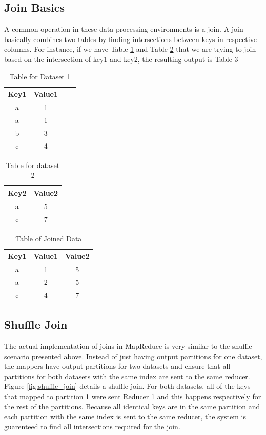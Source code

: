 \subsection{Join Basics}

A common operation in these data processing environments is a join.
A join basically combines two tables by finding intersections between
keys in respective columns. For instance, if we have   
Table \ref{table:join1} and Table \ref{table:join2} that we are trying to join based on the intersection
of key1 and key2, the resulting output is Table \ref{table:join3}   
\begin{table}[h!]
\centering
 \begin{tabular}{|c |c |c |c|}
  \hline
   Key1 & Value1 \\
  \hline
   a & 1 \\
  \hline
   a & 1 \\
  \hline
   b & 3 \\
  \hline
   c & 4 \\
  \hline
\end{tabular}
\caption{Table for Dataset 1}
\label{table:join1}
\end{table}

\begin{table}[h!]
\centering
 \begin{tabular}{|c |c|}
  \hline
   Key2 & Value2 \\
  \hline
   a & 5 \\
  \hline
   c & 7 \\
  \hline
\end{tabular}
\caption{Table for dataset 2}
\label{table:join2}
\end{table}

\begin{table}[h!]
\centering
 \begin{tabular}{|c |c |c|}
  \hline
   Key1 & Value1 & Value2  \\
  \hline
   a & 1 & 5 \\
  \hline
   a & 2 & 5 \\
  \hline
   c & 4 & 7 \\
  \hline
\end{tabular}
\caption{Table of Joined Data}
\label{table:join3}
\end{table}

\subsection{Shuffle Join}
The actual implementation of joins in MapReduce is very similar to the
shuffle scenario presented above. Instead of just having output partitions for one dataset,
the mappers have output partitions for two datasets and ensure that all partitions for both datasets  with the same index 
are sent to the same reducer.  
Figure \ref{fig:shuffle_join} details a shuffle join.
For both datasets, all of the keys that 
mapped to partition 1 were sent Reducer 1 and this happens respectively for the rest of the partitions. Because
all identical keys are in the same partition and each partition with the same index is sent to the same reducer,
the system is guarenteed to find all intersections required for the join.

